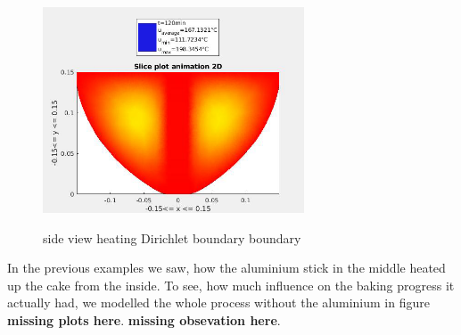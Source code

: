 \begin{figure}[htp]
{	\includegraphics[width=0.69\textwidth]{figures/dirichlet_heat_200_2D121.png}
	}
	\caption{\label{fig::dirichletHeat2D} side view heating Dirichlet boundary boundary}
\end{figure}

In the previous examples we saw, how the aluminium stick in the middle heated up the cake from the inside. To see, how much influence on the baking progress it actually had, we modelled the whole process without the aluminium in figure \textbf{missing plots here}. \textbf{missing obsevation here}.